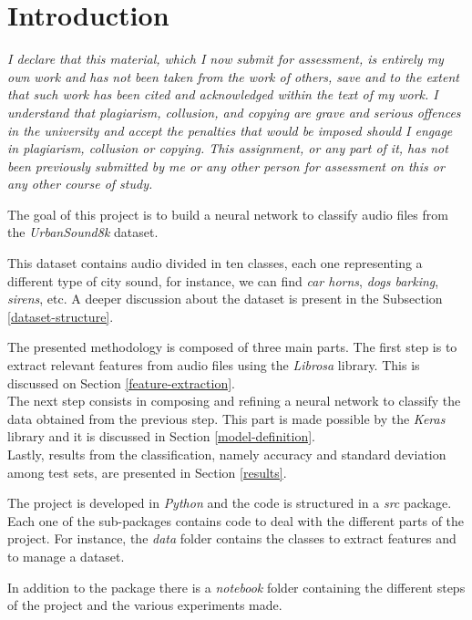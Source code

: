 \section{Introduction}

\emph{I declare that this material, which I now submit for assessment, 
is entirely my own work and has not been taken from the work of others, 
save and to the extent that such work has been cited and acknowledged within 
the text of my work. I understand that plagiarism, collusion, and copying 
are grave and serious offences in the university and accept the penalties that 
would be imposed should I engage in plagiarism, collusion or copying. 
This assignment, or any part of it, has not been previously submitted by 
me or any other person for assessment on this or any other course of study.}

The goal of this project is to build a neural network to classify audio 
files from the \emph{UrbanSound8k} dataset.

This dataset contains audio divided in ten classes, each one representing 
a different type of city sound, for instance, we can find \emph{car horns}, 
\emph{dogs barking}, \emph{sirens}, etc. A deeper discussion about 
the dataset is present in the Subsection \vref*{dataset-structure}.

The presented methodology is composed of three main parts.
The first step is to extract relevant features from audio files using the
\emph{Librosa} library. This is discussed on Section 
\vref*{feature-extraction}.\\
The next step consists in composing and refining a neural network 
to classify the data obtained from the previous step. This part is 
made possible by the \emph{Keras} library and it is discussed in 
Section \vref*{model-definition}.\\
Lastly, results from the classification, namely accuracy 
and standard deviation among test sets, are presented in 
Section \vref*{results}.

The project is developed in \emph{Python} and the code is structured in 
a \emph{src} package. Each one of the sub-packages contains code to deal 
with the different parts of the project. For instance, the \emph{data} folder 
contains the classes to extract features and to manage a dataset.

In addition to the package there is a \emph{notebook} folder containing
the different steps of the project and the various experiments made.

\newpage